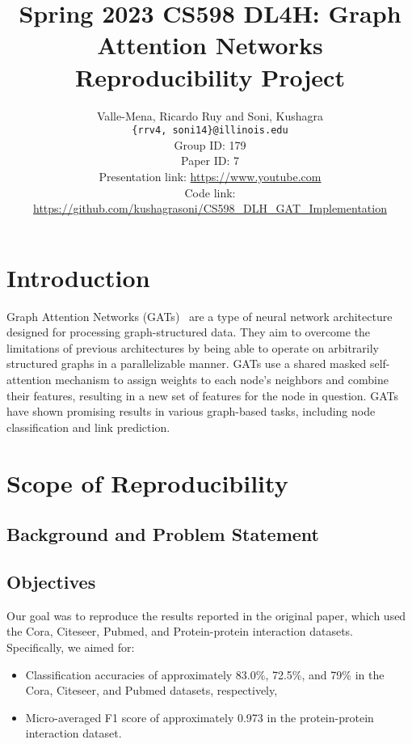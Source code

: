 \documentclass{article}
\title{Spring 2023 CS598 DL4H: Graph Attention Networks Reproducibility Project}
\author
{Valle-Mena, Ricardo Ruy and Soni, Kushagra \\
    \texttt{\{rrv4, soni14\}@illinois.edu}
    \\[2em]
    Group ID: 179\\
    Paper ID: 7\\
    Presentation link: \url{https://www.youtube.com} \\
    Code link: \url{https://github.com/kushagrasoni/CS598_DLH_GAT_Implementation}
    \\[2em]
}
\begin{document}
    \maketitle
\section{Introduction}\label{sec:introduction}
    Graph Attention Networks (GATs)~\cite{velickovic2018graph} are a type of neural network architecture designed for
    processing graph-structured data.
    They aim to overcome the limitations of previous architectures by being able to operate on arbitrarily structured graphs in a parallelizable manner.
    GATs use a shared masked self-attention mechanism to assign weights to each node's neighbors and combine their features, resulting in a new set of features for the node in question.
    GATs have shown promising results in various graph-based tasks, including node classification and link prediction.

    \section{Scope of Reproducibility}\label{sec:scope-of-reproducibility}

    \subsection{Background and Problem Statement}\label{sec:background-and-problem-statement}
    

    \subsection{Objectives}\label{sec:objectives}
    Our goal was to reproduce the results reported in the original paper, which used the Cora, Citeseer, Pubmed, and Protein-protein interaction datasets.
    Specifically, we aimed for:
    \begin{itemize}
        \item Classification accuracies of approximately 83.0\%, 72.5\%, and 79\% in the Cora, Citeseer, and Pubmed
        datasets, respectively,
        \item Micro-averaged F1 score of approximately 0.973 in the protein-protein interaction dataset.
    \end{itemize}
\end{document}
